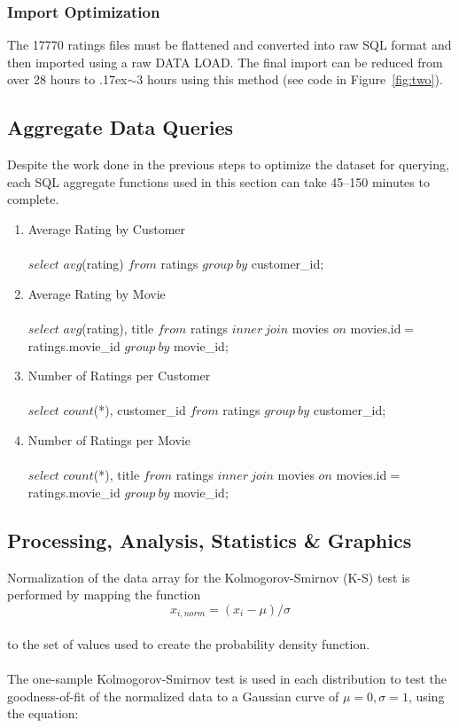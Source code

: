 \documentclass[prodmode,acmtecs]{acmsmall}
\begin{document}
\subsubsection{Import Optimization}
The 17770 ratings files must be flattened and converted into raw SQL format and then imported using a raw DATA LOAD. The final import can be reduced from over 28 hours to {\raise.17ex\hbox{$\scriptstyle\mathtt{\sim}$}}3 hours using this method (see code in Figure~\ref{fig:two}).


\subsection{Aggregate Data Queries}

Despite the work done in the previous steps to optimize the dataset for querying, each SQL aggregate functions used in this section can take 45--150 minutes to complete.
\begin{enumerate}
	\item Average Rating by Customer \\ \\
		$select$ $avg$(rating) $from$ ratings $group\ by$ customer\_id;
		\\

	\item Average Rating by Movie \\ \\
		$select$ $avg$(rating), title $from$ ratings $inner\ join$ movies $on$ movies.id$=$ratings.movie\_id $group\ by$ movie\_id;
		\\

	\item Number of Ratings per Customer \\ \\
		$select$ $count$(*), customer\_id $from$ ratings $group\ by$ customer\_id;
		\\

	\item Number of Ratings per Movie \\ \\
		$select$ $count$(*), title $from$ ratings $inner\ join$ movies $on$ movies.id$=$ ratings.movie\_id $group\ by$ movie\_id;
		\\

\end{enumerate}

\subsection{Processing, Analysis, Statistics \& Graphics}
Normalization of the data array for the Kolmogorov-Smirnov (K-S) test is performed by mapping the function
\begin{equation}
x_{i,norm}=(x_i-\mu)/\sigma
\end{equation}
\\to the set of values used to create the probability density function.
\\
\\
The one-sample Kolmogorov-Smirnov test is used in each distribution to test the goodness-of-fit of the normalized data to a Gaussian curve of $\mu=0, \sigma=1$, using the equation:
\end{document}
